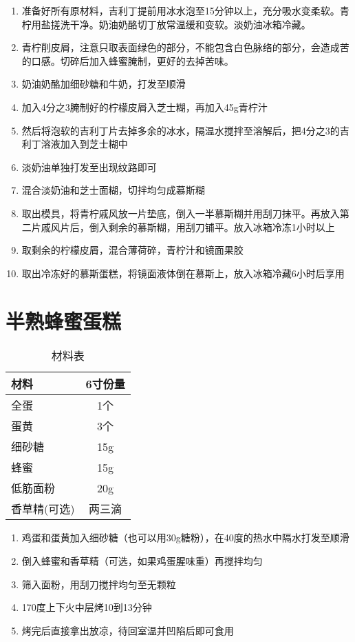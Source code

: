 \begin{enumerate}
    \item 准备好所有原材料，吉利丁提前用冰水泡至15分钟以上，充分吸水变柔软。青柠用盐搓洗干净。奶油奶酪切丁放常温缓和变软。淡奶油冰箱冷藏。
    \item 青柠削皮屑，注意只取表面绿色的部分，不能包含白色脉络的部分，会造成苦的口感。切碎后加入蜂蜜腌制，更好的去掉苦味。
    \item 奶油奶酪加细砂糖和牛奶，打发至顺滑
    \item 加入4分之3腌制好的柠檬皮屑入芝士糊，再加入45g青柠汁
    \item 然后将泡软的吉利丁片去掉多余的冰水，隔温水搅拌至溶解后，把4分之3的吉利丁溶液加入到芝士糊中
    \item 淡奶油单独打发至出现纹路即可
    \item 混合淡奶油和芝士面糊，切拌均匀成慕斯糊
    \item 取出模具，将青柠戚风放一片垫底，倒入一半慕斯糊并用刮刀抹平。再放入第二片戚风片后，倒入剩余的慕斯糊，用刮刀铺平。放入冰箱冷冻1小时以上
    \item 取剩余的柠檬皮屑，混合薄荷碎，青柠汁和镜面果胶
    \item 取出冷冻好的慕斯蛋糕，将镜面液体倒在慕斯上，放入冰箱冷藏6小时后享用
\end{enumerate}


\section{半熟蜂蜜蛋糕}

\begin{table}[H]
    \centering
    \begin{tabular}{|l||c|}\hline
     \textbf{材料}    &  \textbf{6寸份量}\\ \hline\hline
    全蛋 & 1个 \\ \hline
    蛋黄 & 3个 \\ \hline
    细砂糖 & 15g \\ \hline
    蜂蜜 & 15g \\ \hline
    低筋面粉 & 20g \\ \hline
    香草精(可选) & 两三滴 \\ \hline
    \end{tabular}
    \caption{材料表}
\end{table}

\begin{enumerate}
    \item 鸡蛋和蛋黄加入细砂糖（也可以用30g糖粉），在40度的热水中隔水打发至顺滑
    \item 倒入蜂蜜和香草精（可选，如果鸡蛋腥味重）再搅拌均匀
    \item 筛入面粉，用刮刀搅拌均匀至无颗粒
    \item 170度上下火中层烤10到13分钟
    \item 烤完后直接拿出放凉，待回室温并凹陷后即可食用
\end{enumerate}


